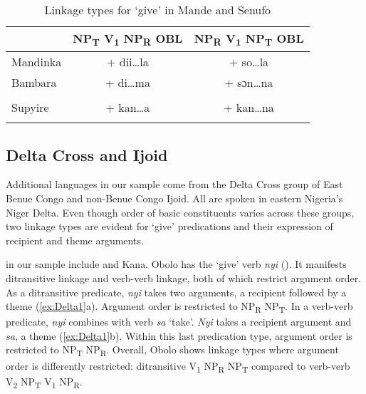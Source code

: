 \documentclass[output=paper,colorlinks,citecolor=brown]{langscibook}
\begin{document}
\vfill
\begin{table}[H]
\caption{Linkage types for ‘give’ in Mande and Senufo}
\label{tab:LinkageMande}
 \begin{tabular}{lcc}
  \lsptoprule
 &  NP\textsubscript{T} V\textsubscript{1} NP\textsubscript{R} OBL	&NP\textsubscript{R} V\textsubscript{1} NP\textsubscript{T} OBL \\
  \midrule
Mandinka &	+ dii…la &	+ so…la\\
Bambara &	 + di…ma & + sɔn…na	\\
&& \\
Supyire &+ kan…a& + kan…na \\
  \lspbottomrule
 \end{tabular}
\end{table}
\vfill\pagebreak

\subsection{Delta Cross and Ijoid}

Additional languages in our sample come from the Delta Cross group of East Benue Congo and non-Benue Congo Ijoid. All are spoken in eastern Nigeria’s Niger Delta. Even though order of basic constituents varies across these groups, two linkage types are evident for ‘give’ predications and their expression of recipient and theme arguments.

 in our sample include  and Kana. Obolo has the ‘give’ verb \textit{nyi} (\citealt{Aaron1999, Faraclas1984}). It manifests ditransitive linkage and verb-verb linkage, both of which restrict argument order. As a ditransitive predicate, \textit{nyi} takes two arguments, a recipient followed by a theme (\ref{ex:Delta1}a). Argument order is restricted to NP\textsubscript{R} NP\textsubscript{T}. In a verb-verb predicate, \textit{nyi} combines with verb \textit{sa} ‘take’. \textit{Nyi} takes a recipient argument and \textit{sa}, a theme (\ref{ex:Delta1}b). Within this last predication type, argument order is restricted to NP\textsubscript{T} NP\textsubscript{R}. Overall, Obolo shows linkage types where argument order is differently restricted: ditransitive V\textsubscript{1} NP\textsubscript{R} NP\textsubscript{T} compared to verb-verb V\textsubscript{2} NP\textsubscript{T} V\textsubscript{1} NP\textsubscript{R}.
\end{document}
